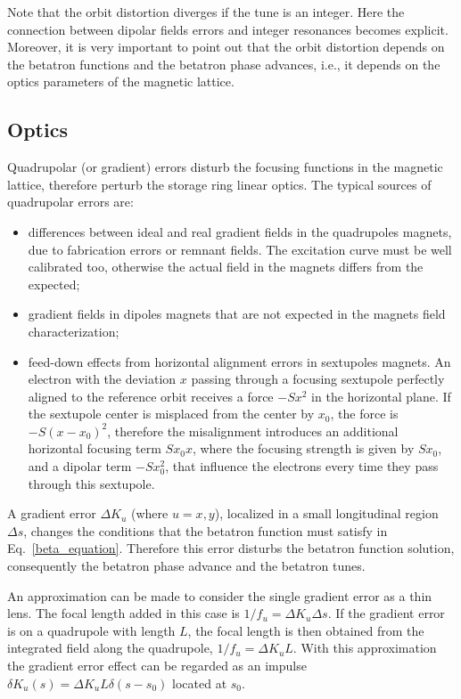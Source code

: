 Note that the orbit distortion diverges if the tune is an integer. Here the connection between dipolar fields errors and integer resonances becomes explicit. Moreover, it is very important to point out that the orbit distortion depends on the betatron functions and the betatron phase advances, i.e., it depends on the optics parameters of the magnetic lattice.
\subsection{Optics}\label{subsec:optics}
Quadrupolar (or gradient) errors disturb the focusing functions in the magnetic lattice, therefore perturb the storage ring linear optics. The typical sources of quadrupolar errors are:
\begin{itemize}
    \item differences between ideal and real gradient fields in the quadrupoles magnets, due to fabrication errors or remnant fields. The excitation curve must be well calibrated too, otherwise the actual field in the magnets differs from the expected;
    \item gradient fields in dipoles magnets that are not expected in the magnets field characterization;
    \item feed-down effects from horizontal alignment errors in sextupoles magnets. An electron with the deviation $x$ passing through a focusing sextupole perfectly aligned to the reference orbit receives a force $-Sx^2$ in the horizontal plane. If the sextupole center is misplaced from the center by $x_0$, the force is $-S(x - x_0)^2$, therefore the misalignment introduces an additional horizontal focusing term $ Sx_0 x$, where the focusing strength is given by $Sx_0$, and a dipolar term $-S x_0^2$, that influence the electrons every time they pass through this sextupole.
\end{itemize}

A gradient error $\Delta K_u$ (where $u=x, y$), localized in a small longitudinal region $\Delta s$, changes the conditions that the betatron function must satisfy in Eq.~\eqref{beta_equation}. Therefore this error disturbs the betatron function solution, consequently the betatron phase advance and the betatron tunes.

An approximation can be made to consider the single gradient error as a thin lens. The focal length added in this case is $1/f_u = \Delta K_u \Delta s$. If the gradient error is on a quadrupole with length $L$, the focal length is then obtained from the integrated field along the quadrupole, $1/f_u = \Delta K_u L$. With this approximation the gradient error effect can be regarded as an impulse $\delta K_u(s) = \Delta K_uL \delta(s-s_0)$ located at $s_0$.

